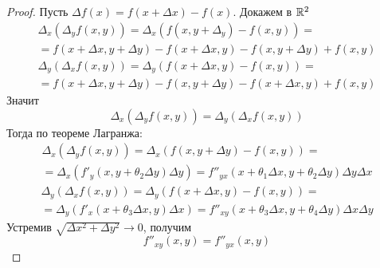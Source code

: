 \begin{proof} 
    Пусть $\Delta f(x)=f(x+\Delta x)-f(x)$. Докажем в $\mathbb{R}^2$
    \begin{multline*}
        \Delta_x(\Delta_y f(x,y))=\Delta_x(f(x,y+\Delta_y)-f(x,y))=\\
        =f(x+\Delta x, y+\Delta y)-f(x+\Delta x, y)-f(x,y+\Delta y)+f(x,y)
    \end{multline*}
    \begin{multline*}
        \Delta_y(\Delta_x f(x,y))=\Delta_y(f(x+\Delta x,y)-f(x,y))=\\
        =f(x+\Delta x, y+\Delta y)-f(x,y+\Delta y)-f(x+\Delta x,y)+f(x,y)
    \end{multline*}
    Значит
    \[\Delta_x(\Delta_y f(x,y))=\Delta_y(\Delta_x f(x,y))\]
    Тогда по теореме Лагранжа:
    \begin{multline*}
        \Delta_x(\Delta_y f(x,y))=\Delta_x (f(x,y+\Delta y)-f(x,y))=\\
        =\Delta_x(f'_y(x,y+\theta_2\Delta y)\Delta y)=f''_{yx}(x+\theta_1\Delta x,y+\theta_2\Delta y)\Delta y \Delta x
    \end{multline*}
    \begin{multline*}
        \Delta_y(\Delta_x f(x,y))=\Delta_y (f(x+\Delta x,y)-f(x,y))=\\
        =\Delta_y(f'_x(x+\theta_3\Delta x,y)\Delta x)=f''_{xy}(x+\theta_3 \Delta x, y+\theta_4 \Delta y)\Delta x\Delta y
    \end{multline*}
    Устремив $\sqrt{\Delta x^2+\Delta y^2}\to 0$, получим
    \[f''_{xy}(x,y)=f''_{yx}(x,y)\]
\end{proof} 